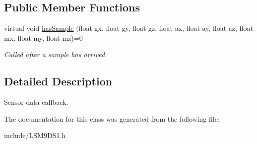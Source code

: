 \subsection*{Public Member Functions}
\begin{DoxyCompactItemize}
\item 
\mbox{\label{classLSM9DS1callback_a6efb40eeb27fbb5fd0ffbdf2dbbdf326}} 
virtual void \hyperlink{classLSM9DS1callback_a6efb40eeb27fbb5fd0ffbdf2dbbdf326}{has\+Sample} (float gx, float gy, float gz, float ax, float ay, float az, float mx, float my, float mz)=0
\begin{DoxyCompactList}\small\item\em Called after a sample has arrived. \end{DoxyCompactList}\end{DoxyCompactItemize}


\subsection{Detailed Description}
Sensor data callback. 

The documentation for this class was generated from the following file\+:\begin{DoxyCompactItemize}
\item 
include/L\+S\+M9\+D\+S1.\+h\end{DoxyCompactItemize}
